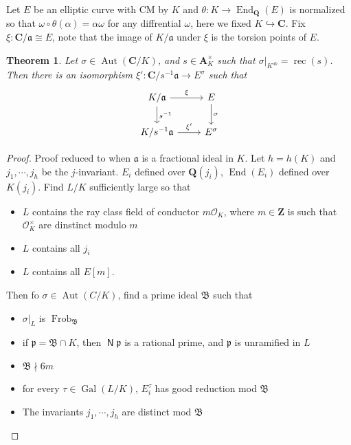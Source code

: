 \documentclass[leqno]{amsart}
\newcommand{\cO}{\mathcal O} %
\newcommand{\Q}{{\mathbf{Q}}}
\newcommand{\Z}{{\mathbf{Z}}}
\newcommand{\C}{\mathbf C}
\newcommand{\A}{\mathbf A}
\DeclareMathOperator{\Gal}{Gal}
\DeclareMathOperator{\Nr}{\mathsf{N}}
\newcommand{\1}{\mathbf{1}}
\newcommand{\fa}{\mathfrak a}
\newcommand{\fp}{\mathfrak p}
\DeclareMathOperator{\End}{End}
\DeclareMathOperator{\Aut}{Aut}
\DeclareMathOperator{\Frob}{Frob}
\DeclareMathOperator{\rec}{rec}
\newtheorem{thm}{Theorem}[section]
\theoremstyle{definition}
\theoremstyle{remark}
\begin{document}
Let $E$ be an elliptic curve with CM by  $K$
and  $\theta\colon K\to \End_\Q(E)$ is normalized so that
$\omega\circ \theta(\alpha)=\alpha\omega$ for any diffrential  $\omega$,
here we fixed  $K\hookrightarrow \C$.
Fix $\xi\colon \C/\fa\cong E$, note that 
the image of  $K/\fa$ under  $\xi$
is the torsion points of  $E$.
 \begin{thm}
	 Let $\sigma\in \Aut(\C/K)$, and
	 $s\in \A_K^\times$ such that 
	  $\sigma\vert_{K^{ab}}=\rec(s)$. 
	  Then there is an isomorphism 
	  $\xi'\colon \C/s^{-1}\fa\to E^\sigma$ such that
	   \[
	  	\begin{tikzcd}
			K/\fa \arrow[r,"\xi"]\arrow[d,"s^{-1}"] 
				& E \arrow[d,"\sigma"]\\
			K/s^{-1}\fa \arrow[r,"\xi'"] & E^\sigma
	  	\end{tikzcd}
	  \]
\end{thm}
\begin{proof}
	Proof reduced to when $\fa$ is a fractional ideal in  $K$.
	Let  $h=h(K)$ and $j_1,\cdots,j_h$ be the $j$-invariant.
	$E_i$ defined over  $\Q(j_i)$,
	$\End(E_i)$ defined over  $K(j_i)$.
	Find  $L/K$ sufficiently large so that
	\begin{itemize}
		\item $L$ contains the ray class field of conductor
			$m\cO_K$, where $m\in \Z$
			is such that $\cO_K^\times$
			are dinstinct modulo $m$
		\item $L$ contains all $j_i$
		\item  $L$ contains all  $E[m]$.
	\end{itemize}
	Then fo $\sigma\in \Aut(C/K)$, find a prime ideal
	$\mathfrak{B}$ such that
	\begin{itemize}
		\item $\sigma\vert_L$ is  $\Frob_\mathfrak{B}$
		\item if  $\fp=\mathfrak{B}\cap K$, then
			 $\Nr\fp$ is a rational prime,
			 and  $\fp$ is unramified in  $L$
		 \item $\mathfrak{B}\nmid 6m$
		 \item for every $\tau\in \Gal(L/K)$,
			 $E_i^\tau$ has good reduction mod $\mathfrak{B}$
		 \item The invariants $j_1,\cdots,j_h$
			 are distinct mod  $\mathfrak{B}$
	\end{itemize}
\end{proof}

\end{document}
